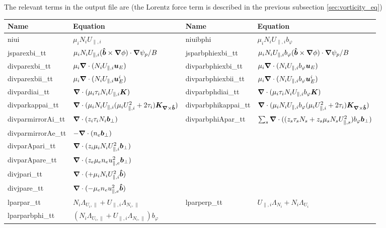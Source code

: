 The relevant terms in the output file are (the Lorentz force term is described in the previous subsection \ref{sec:vorticity_eq})
\begin{longtable}{llll}
\toprule
\rowcolor{gray!50}\textbf{Name} &  \textbf{Equation} &
\textbf{Name} &  \textbf{Equation}\\
\midrule
    niui &$\mu_i N_i U_{\parallel,i}$ &
    niuibphi &$\mu_i N_iU_{\parallel,i}b_\varphi$ \\
    jsparexbi\_tt       & $\mu_i N_iU_{\parallel,i}(\bm{\hat{b}}\times{\boldsymbol{\nabla}}\phi)\cdot{\boldsymbol{\nabla}} \psi_p/B$ &
    jsparbphiexbi\_tt   & $\mu_i N_iU_{\parallel,i}b_\varphi(\bm{\hat{b}}\times{\boldsymbol{\nabla}}\phi)\cdot{\boldsymbol{\nabla}} \psi_p/B$ \\
    divparexbi\_tt       & $\mu_i {\boldsymbol{\nabla}}\cdot (N_iU_{\parallel,i}{\boldsymbol{u}}_E)$ &
    divparbphiexbi\_tt   & $\mu_i{\boldsymbol{\nabla}}\cdot( N_iU_{\parallel,i}b_\varphi {\boldsymbol{u}}_E)$ \\
    divparexbii\_tt       & $\mu_i {\boldsymbol{\nabla}}\cdot (N_iU_{\parallel,i}{\boldsymbol{u}}_E^i)$ &
    divparbphiexbii\_tt   & $\mu_i{\boldsymbol{\nabla}}\cdot( N_iU_{\parallel,i}b_\varphi {\boldsymbol{u}}_E^i)$ \\
    divpardiai\_tt       & ${\boldsymbol{\nabla}}\cdot(\mu_i \tau_i N_iU_{\parallel,i}{\boldsymbol{K}})$ &
    divparbphdiai\_tt   & ${\boldsymbol{\nabla}}\cdot ( \mu_i \tau_i N_iU_{\parallel,i}b_\varphi{\boldsymbol{K}})$ \\
    divparkappai\_tt       & ${\boldsymbol{\nabla}}\cdot (\mu_i N_iU_{\parallel,i} ( \mu_i U_{\parallel,i}^2 + 2\tau_i){{\boldsymbol{K}}_{{\boldsymbol{\nabla}}\times\bm{\hat{b}}}} )$ &
    divparbphikappai\_tt       & ${\boldsymbol{\nabla}}\cdot( \mu_i N_iU_{\parallel,i}b_\varphi ( \mu_i U_{\parallel,i}^2 + 2\tau_i){{\boldsymbol{K}}_{{\boldsymbol{\nabla}}\times\bm{\hat{b}}}})$ \\
    divparmirrorAi\_tt       & ${\boldsymbol{\nabla}}\cdot(z_i \tau_i N_i {\boldsymbol{b}}_\perp)$ &
    divparbphiApar\_tt   & $\sum_s {\boldsymbol{\nabla}}\cdot ((z_s \tau_s N_s + z_s \mu_s N_s U_{\parallel,s}^2)b_\varphi {\boldsymbol{b}}_\perp)$ \\
    divparmirrorAe\_tt       & $-{\boldsymbol{\nabla}}\cdot ( n_e {\boldsymbol{b}}_\perp)$ &
    & \\
    divparApari\_tt       & ${\boldsymbol{\nabla}}\cdot( z_i \mu_i N_i U_{\parallel,i}^2{\boldsymbol{b}}_\perp)$ &
    & \\
    divparApare\_tt       & ${\boldsymbol{\nabla}}\cdot( z_e \mu_e n_e u_{\parallel,e}^2{\boldsymbol{b}}_\perp)$ &
    & \\
    divjpari\_tt & $ {\boldsymbol{\nabla}}\cdot( +\mu_i N_i U_{\parallel,i}^2 \bm{\hat{b}})$ &
    & \\
    divjpare\_tt & $ {\boldsymbol{\nabla}}\cdot( -\mu_e n_e u_{\parallel,e}^2 \bm{\hat{b}})$ &
    & \\
    lparpar\_tt   & $N_i \Lambda_{U_i,\parallel} + U_{\parallel,i} \Lambda_{N_i,\parallel}$ &
    lparperp\_tt & $U_{\parallel,i} \Lambda_{N_i} + N_i\Lambda_{U_i} $ \\
    lparparbphi\_tt   & $(N_i \Lambda_{U_i,\parallel} + U_{\parallel,i} \Lambda_{N_i,\parallel})b_\varphi$ &

\end{longtable}
